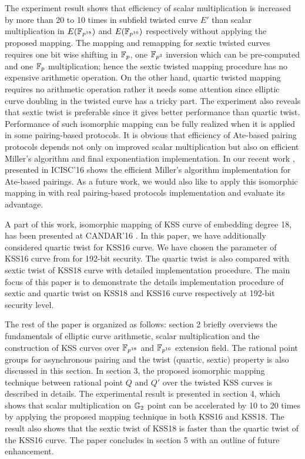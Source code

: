 The experiment result shows  that efficiency of  scalar multiplication is increased by more than 20 to 10 times in subfield  twisted curve $E'$ than scalar multiplication in $E(\mathbb{F}_{p^{18}})$ and $E(\mathbb{F}_{p^{16}})$ respectively without applying the proposed mapping. The mapping and remapping for sextic twisted curves requires one bit wise shifting in ${\mathbb{F}}_{p}$, one $\mathbb{F}_{p^3}$ inversion which can be pre-computed and one ${\mathbb{F}}_{p}$ multiplication; hence the sextic twisted mapping procedure has no expensive arithmetic operation. On the other hand, quartic twisted mapping requires no arithmetic operation rather it needs some attention since elliptic curve doubling in the twisted curve has a tricky part. The experiment also reveals that sextic twist is preferable since it gives better performance than quartic twist. 
Performance of such isomorphic mapping can be fully realized when it is applied in some pairing-based protocols. 
It is obvious that efficiency of Ate-based pairing protocols depends not only on improved scalar multiplication but also on efficient Miller's algorithm  and final exponentiation implementation. In our recent work \cite{self_icisc}, presented in ICISC'16 shows the  efficient Miller's algorithm implementation for Ate-based pairings. 
As a future work, we would also like to apply this isomorphic mapping  in \cite{self_icisc} with real pairing-based protocols implementation and evaluate its advantage. 

A part of this work, isomorphic mapping of KSS curve of embedding degree 18, has been presented at CANDAR'16 \cite{self_candar}.
In this paper, we have additionally considered quartic twist for  KSS16 curve. 
We have chosen the parameter of KSS16 curve from \cite{kss_lub} for 192-bit security.
The quartic twist is also compared with sextic twist of KSS18 curve with detailed implementation procedure. 
The main focus of this paper is to demonstrate the details implementation procedure of sextic and quartic twist on KSS18 and KSS16 curve respectively at 192-bit security level. 

The rest of the paper is organized as follows: section 2  briefly overviews the fundamentals of elliptic curve arithmetic, scalar multiplication and the construction of  KSS curves over $\mathbb{F}_{p^{18}}$ and $\mathbb{F}_{p^{16}}$ extension field. The rational point groups for asynchronous pairing and the twist (quartic, sextic) property is also discussed in this section.  
In section 3, the proposed isomorphic mapping technique between rational point $Q$ and $Q'$ over the twisted KSS curves is described in details. 
The experimental result is presented in section 4, which shows that scalar multiplication on ${\mathbb{G}}_{2}$ point can be accelerated by 10 to 20 times by applying the proposed mapping technique in both KSS16 and KSS18. The result also shows that the sextic twist of KSS18 is faster than the quartic twist of the KSS16 curve. 
The paper concludes in section 5  with an outline of future enhancement.


